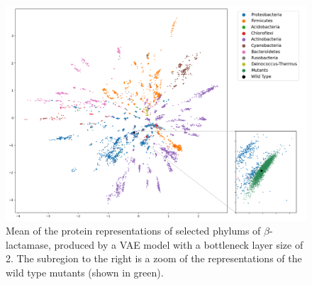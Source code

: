 \begin{figure}[H]
    \centering
    \includegraphics[width = \linewidth]{report/figures/family_and_mutations.png}
    \caption{Mean of the protein representations of selected phylums of $\beta$-lactamase, produced by a VAE model with a bottleneck layer size of 2. The subregion to the right is a zoom of the representations of the wild type mutants (shown in green).}
    \label{fig:2dimvae}
\end{figure}

